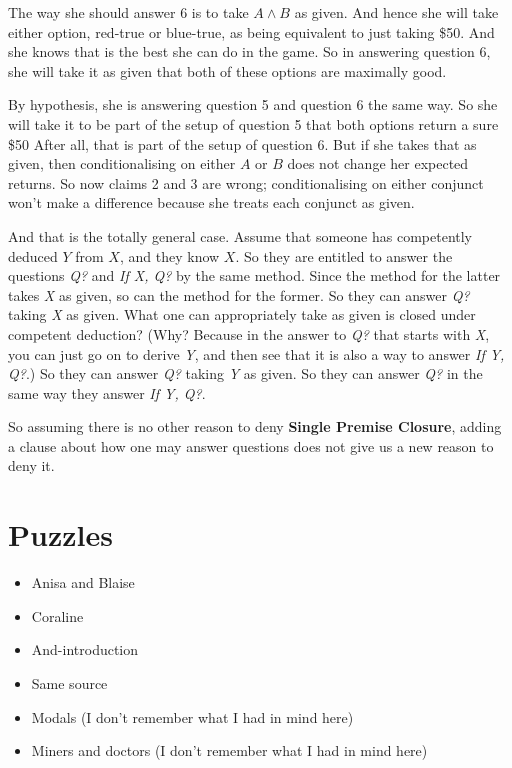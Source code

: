 \documentclass[11pt,]{book}
\providecommand{\tightlist}{%
  \setlength{\itemsep}{0pt}\setlength{\parskip}{0pt}}
\begin{document}
The way she should answer 6 is to take \(A \wedge B\) as given. And hence she will take either option, red-true or blue-true, as being equivalent to just taking \$50. And she knows that is the best she can do in the game. So in answering question 6, she will take it as given that both of these options are maximally good.

By hypothesis, she is answering question 5 and question 6 the same way. So she will take it to be part of the setup of question 5 that both options return a sure \$50 After all, that is part of the setup of question 6. But if she takes that as given, then conditionalising on either \(A\) or \(B\) does not change her expected returns. So now claims 2 and 3 are wrong; conditionalising on either conjunct won't make a difference because she treats each conjunct as given.

And that is the totally general case. Assume that someone has competently deduced \(Y\) from \(X\), and they know \(X\). So they are entitled to answer the questions \emph{Q?} and \emph{If X, Q?} by the same method. Since the method for the latter takes \emph{X} as given, so can the method for the former. So they can answer \emph{Q?} taking \emph{X} as given. What one can appropriately take as given is closed under competent deduction? (Why? Because in the answer to \emph{Q?} that starts with \emph{X}, you can just go on to derive \emph{Y}, and then see that it is also a way to answer \emph{If Y, Q?}.) So they can answer \emph{Q?} taking \emph{Y} as given. So they can answer \emph{Q?} in the same way they answer \emph{If Y, Q?}.

So assuming there is no other reason to deny \textbf{Single Premise Closure}, adding a clause about how one may answer questions does not give us a new reason to deny it.

\hypertarget{puzzles}{%
\section{Puzzles}\label{puzzles}}

\begin{itemize}
\tightlist
\item
  Anisa and Blaise
\item
  Coraline
\item
  And-introduction
\item
  Same source
\item
  Modals (I don't remember what I had in mind here)
\item
  Miners and doctors (I don't remember what I had in mind here)
\end{itemize}
\end{document}

